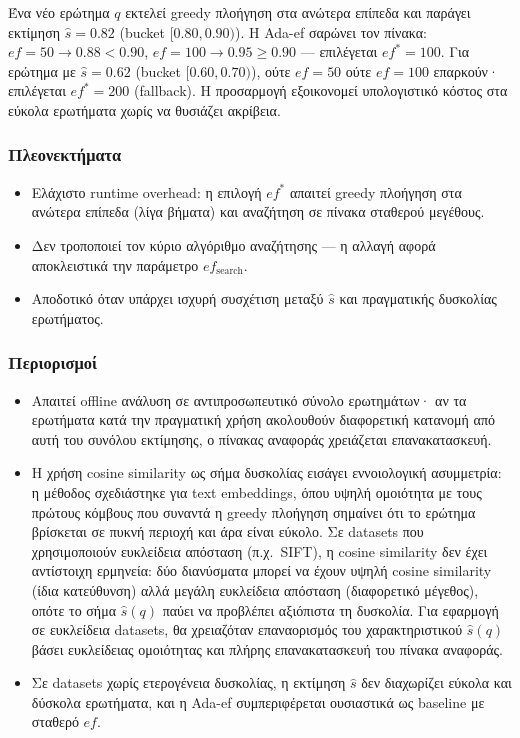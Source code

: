 \documentclass[12pt,a4paper]{article}
\begin{document}
Ένα νέο ερώτημα $q$ εκτελεί greedy πλοήγηση στα ανώτερα επίπεδα και παράγει εκτίμηση $\hat{s} = 0.82$ (bucket $[0.80, 0.90)$). Η Ada-ef σαρώνει τον πίνακα: $ef=50 \to 0.88 < 0.90$, $ef=100 \to 0.95 \geq 0.90$ — επιλέγεται $ef^* = 100$. Για ερώτημα με $\hat{s} = 0.62$ (bucket $[0.60, 0.70)$), ούτε $ef=50$ ούτε $ef=100$ επαρκούν· επιλέγεται $ef^* = 200$ (fallback). Η προσαρμογή εξοικονομεί υπολογιστικό κόστος στα εύκολα ερωτήματα χωρίς να θυσιάζει ακρίβεια.

\subsubsection*{Πλεονεκτήματα}
\begin{itemize}
    \item Ελάχιστο runtime overhead: η επιλογή $ef^*$ απαιτεί greedy πλοήγηση στα ανώτερα επίπεδα (λίγα βήματα) και αναζήτηση σε πίνακα σταθερού μεγέθους.
    \item Δεν τροποποιεί τον κύριο αλγόριθμο αναζήτησης — η αλλαγή αφορά αποκλειστικά την παράμετρο $ef_{\text{search}}$.
    \item Αποδοτικό όταν υπάρχει ισχυρή συσχέτιση μεταξύ $\hat{s}$ και πραγματικής δυσκολίας ερωτήματος.
\end{itemize}

\subsubsection*{Περιορισμοί}
\begin{itemize}
    \item Απαιτεί offline ανάλυση σε αντιπροσωπευτικό σύνολο ερωτημάτων· αν τα ερωτήματα κατά την πραγματική χρήση ακολουθούν διαφορετική κατανομή από αυτή του συνόλου εκτίμησης, ο πίνακας αναφοράς χρειάζεται επανακατασκευή.
    \item Η χρήση cosine similarity ως σήμα δυσκολίας εισάγει εννοιολογική ασυμμετρία: η μέθοδος σχεδιάστηκε για text embeddings, όπου υψηλή ομοιότητα με τους πρώτους κόμβους που συναντά η greedy πλοήγηση σημαίνει ότι το ερώτημα βρίσκεται σε πυκνή περιοχή και άρα είναι εύκολο. Σε datasets που χρησιμοποιούν ευκλείδεια απόσταση (π.χ.\ SIFT), η cosine similarity δεν έχει αντίστοιχη ερμηνεία: δύο διανύσματα μπορεί να έχουν υψηλή cosine similarity (ίδια κατεύθυνση) αλλά μεγάλη ευκλείδεια απόσταση (διαφορετικό μέγεθος), οπότε το σήμα $\hat{s}(q)$ παύει να προβλέπει αξιόπιστα τη δυσκολία. Για εφαρμογή σε ευκλείδεια datasets, θα χρειαζόταν επαναορισμός του χαρακτηριστικού $\hat{s}(q)$ βάσει ευκλείδειας ομοιότητας και πλήρης επανακατασκευή του πίνακα αναφοράς.
    \item Σε datasets χωρίς ετερογένεια δυσκολίας, η εκτίμηση $\hat{s}$ δεν διαχωρίζει εύκολα και δύσκολα ερωτήματα, και η Ada-ef συμπεριφέρεται ουσιαστικά ως baseline με σταθερό $ef$.
\end{itemize}
\end{document}
